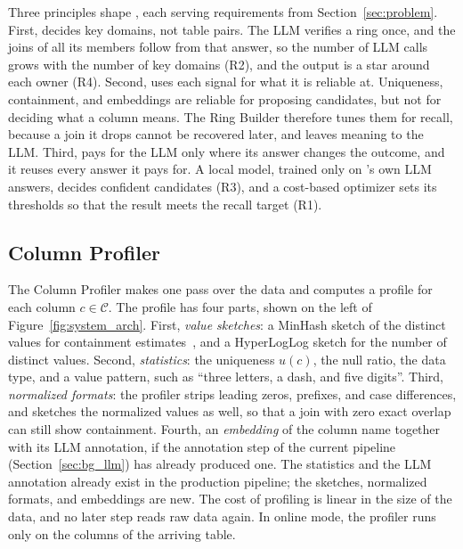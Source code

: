 Three principles shape \ourmethod, each serving requirements from Section~\ref{sec:problem}.
First, \ourmethod decides key domains, not table pairs.
The LLM verifies a ring once, and the joins of all its members follow from that answer, so the number of LLM calls grows with the number of key domains (R2), and the output is a star around each owner (R4).
Second, \ourmethod uses each signal for what it is reliable at.
Uniqueness, containment, and embeddings are reliable for proposing candidates, but not for deciding what a column means.
The Ring Builder therefore tunes them for recall, because a join it drops cannot be recovered later, and leaves meaning to the LLM.
Third, \ourmethod pays for the LLM only where its answer changes the outcome, and it reuses every answer it pays for.
A local model, trained only on \ourmethod's own LLM answers, decides confident candidates (R3), and a cost-based optimizer sets its thresholds so that the result meets the recall target (R1).

\subsection{Column Profiler}
\label{sec:arch_profiler}
The Column Profiler makes one pass over the data and computes a profile for each column $c \in \mathcal{C}$.
The profile has four parts, shown on the left of Figure~\ref{fig:system_arch}.
First, \emph{value sketches}: a MinHash sketch of the distinct values for containment estimates~\cite{DBLP:journals/pvldb/ZhuNPM16}, and a HyperLogLog sketch for the number of distinct values.
Second, \emph{statistics}: the uniqueness $u(c)$, the null ratio, the data type, and a value pattern, such as ``three letters, a dash, and five digits''.
Third, \emph{normalized formats}: the profiler strips leading zeros, prefixes, and case differences, and sketches the normalized values as well, so that a join with zero exact overlap can still show containment.
Fourth, an \emph{embedding} of the column name together with its LLM annotation, if the annotation step of the current pipeline (Section~\ref{sec:bg_llm}) has already produced one.
The statistics and the LLM annotation already exist in the production pipeline; the sketches, normalized formats, and embeddings are new.
The cost of profiling is linear in the size of the data, and no later step reads raw data again.
In online mode, the profiler runs only on the columns of the arriving table.

